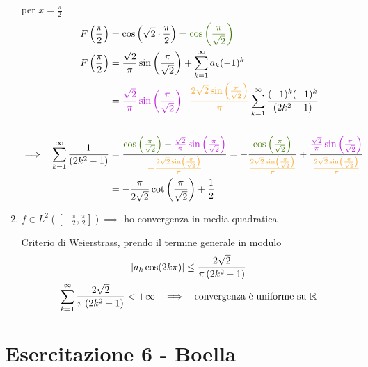 \begin{enumerate}
per $x = \frac{\pi }{2}$\begin{equation*}
\begin{aligned}
F\left(\frac{\pi }{2}\right) & = \cos\left(\sqrt{2} \cdot \frac{\pi }{2}\right) = \textcolor[rgb]{0.25,0.46,0.02}{\cos\left(\frac{\pi }{\sqrt{2}}\right)}\\
F\left(\frac{\pi }{2}\right) & = \frac{\sqrt{2}}{\pi }\sin\left(\frac{\pi }{\sqrt{2}}\right) + \sum\limits ^{\infty }_{k = 1} a_{k}(- 1)^{k}\\
 & = \textcolor[rgb]{0.74,0.06,0.88}{\frac{\sqrt{2}}{\pi }\sin\left(\frac{\pi }{\sqrt{2}}\right)}\textcolor[rgb]{0.96,0.65,0.14}{ - \frac{2\sqrt{2}\sin\left(\frac{\pi }{\sqrt{2}}\right)}{\pi }}\sum\limits ^{\infty }_{k = 1}\frac{(- 1)^{k}(- 1)^{k}}{\left(2k^{2} - 1\right)}\\
 & \\
\implies \ \ \sum\limits ^{\infty }_{k = 1}\frac{1}{\left(2k^{2} - 1\right)} & = \frac{\textcolor[rgb]{0.25,0.46,0.02}{\cos\left(\frac{\pi }{\sqrt{2}}\right)} - \textcolor[rgb]{0.74,0.06,0.88}{\frac{\sqrt{2}}{\pi }\sin\left(\frac{\pi }{\sqrt{2}}\right)}}{\textcolor[rgb]{0.96,0.65,0.14}{ - \frac{2\sqrt{2}\sin\left(\frac{\pi }{\sqrt{2}}\right)}{\pi }}} = - \frac{\textcolor[rgb]{0.25,0.46,0.02}{\cos\left(\frac{\pi }{\sqrt{2}}\right)}}{\textcolor[rgb]{0.96,0.65,0.14}{\frac{2\sqrt{2}\sin\left(\frac{\pi }{\sqrt{2}}\right)}{\pi }}} + \frac{\textcolor[rgb]{0.74,0.06,0.88}{\frac{\sqrt{2}}{\pi }\sin\left(\frac{\pi }{\sqrt{2}}\right)}}{\textcolor[rgb]{0.96,0.65,0.14}{\frac{2\sqrt{2}\sin\left(\frac{\pi }{\sqrt{2}}\right)}{\pi }}}\\
 & = - \frac{\pi }{2\sqrt{2}}\cot\left(\frac{\pi }{\sqrt{2}}\right) + \frac{1}{2}
\end{aligned}
\end{equation*}
\item $f\in L^{2}\left(\left[ - \frac{\pi }{2} ,\frac{\pi }{2}\right]\right) \implies $ ho convergenza in media quadratica

Criterio di Weierstrass, prendo il termine generale in modulo\begin{gather*}
| a_{k}\cos(2k\pi)| \leq \frac{2\sqrt{2}}{\pi \left(2k^{2} - 1\right)}\\
\sum\limits ^{\infty }_{k = 1}\frac{2\sqrt{2}}{\pi \left(2k^{2} - 1\right)} < + \infty \ \ \implies \ \ \text{convergenza è uniforme su} \ \mathbb{R} 
\end{gather*}
\end{enumerate}
\chapter{Esercitazione 6 - Boella}
\ParteEsercizi
\Esercizio{}

